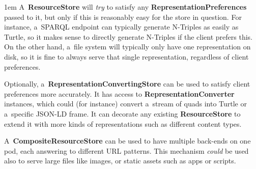 \documentclass[10pt]{article}
\newcommand\component[1]{\mbox{\bf #1}}
\newenvironment{Note}
  {\begin{multicols}{3}%
     \parskip 1em}
  {\end{multicols}}
\begin{document}

\bigskip

\begin{Note}
A~\component{ResourceStore} will \emph{try} to satisfy
any \component{RepresentationPreferences} passed to it,
but only if this is reasonably easy for the store in question.
For instance, a~SPARQL endpoint can typically
generate N-Triples as easily as Turtle,
so it makes sense to directly generate N-Triples
if the client prefers this.
On the other hand,
a~file system will typically only have one representation on disk,
so it is fine to always serve that single representation,
regardless of client preferences.
\columnbreak

Optionally, a~\component{RepresentationConvertingStore} can be used
to satisfy client preferences more accurately.
It has access to \component{RepresentationConverter} instances,
which could (for instance) convert a~stream of quads
into Turtle or a~specific JSON-LD frame.
It can decorate any existing \component{ResourceStore}
to extend it with more kinds of representations
such as different content types.
\columnbreak

A~\component{CompositeResourceStore} can be used
to have multiple back-ends on one pod,
each answering to different URL patterns.
This mechanism \emph{could} be used
also to serve large files like images,
or static assets such as apps or scripts.
\end{Note}
\end{document}
